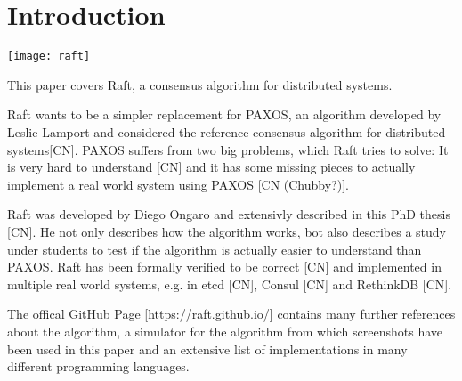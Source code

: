 




\begin{titlepage}
\afterpage{\restorepagecolor}
\newcommand{\colorRule}[3][black]{\textcolor[HTML]{#1}{\rule{#2}{#3}}}
\end{titlepage}
\restoregeometry



{
\hypersetup{linkcolor=}
\setcounter{tocdepth}{3}
\tableofcontents
\pagebreak
}

\section{Introduction}

\texttt{[image: raft]}

This paper covers Raft, a consensus algorithm for distributed systems.

Raft wants to be a simpler replacement for PAXOS, an algorithm developed by Leslie Lamport and considered the reference consensus algorithm for distributed systems[CN]. PAXOS suffers from two big problems, which Raft tries to solve: It is very hard to understand [CN] and it has some missing pieces to actually implement a real world system using PAXOS [CN (Chubby?)].

Raft was developed by Diego Ongaro and extensivly described in this PhD thesis [CN]. He not only describes how the algorithm works, bot also describes a study under students to test if the algorithm is actually easier to understand than PAXOS. Raft has been formally verified to be correct [CN] and implemented in multiple real world systems, e.g. in etcd [CN], Consul [CN] and RethinkDB [CN].

The offical GitHub Page [https://raft.github.io/] contains many further references about the algorithm, a simulator for the algorithm from which screenshots have been used in this paper and an extensive list of implementations in many different programming languages.

